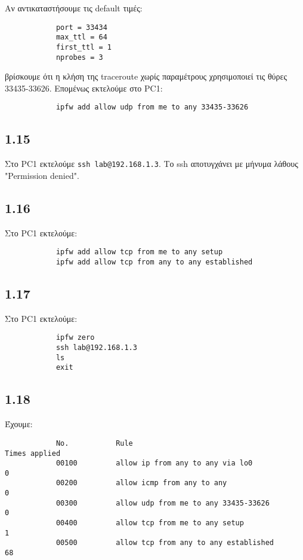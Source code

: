\documentclass[a4paper, 12pt]{article}
\begin{document}
		Αν αντικαταστήσουμε τις default τιμές:
		
		\begin{verbatim}
			port = 33434
			max_ttl = 64
			first_ttl = 1
			nprobes = 3
		\end{verbatim}
		
		βρίσκουμε ότι η κλήση της traceroute χωρίς παραμέτρους χρησιμοποιεί τις θύρες 33435-33626. Επομένως εκτελούμε στο PC1:
		
		\begin{verbatim}
			ipfw add allow udp from me to any 33435-33626 
		\end{verbatim}
		
	\subsection*{1.15}
		Στο PC1 εκτελούμε \verb|ssh lab@192.168.1.3|. Το ssh αποτυγχάνει με μήνυμα λάθους "Permission denied".

	\subsection*{1.16}
		Στο PC1 εκτελούμε:
		
		\begin{verbatim}
			ipfw add allow tcp from me to any setup
			ipfw add allow tcp from any to any established
		\end{verbatim}

	\subsection*{1.17}
		Στο PC1 εκτελούμε:
		
		\begin{verbatim}
			ipfw zero
			ssh lab@192.168.1.3
			ls
			exit
		\end{verbatim}

	\subsection*{1.18}
		Έχουμε:
		
		\begin{verbatim}
			No.           Rule                                          Times applied
			00100         allow ip from any to any via lo0              0
			00200         allow icmp from any to any                    0
			00300         allow udp from me to any 33435-33626          0
			00400         allow tcp from me to any setup                1
			00500         allow tcp from any to any established         68
		\end{verbatim}
		
\end{document}

